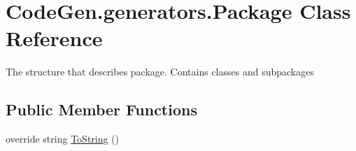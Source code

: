 \hypertarget{classCodeGen_1_1generators_1_1Package}{}\section{Code\+Gen.\+generators.\+Package Class Reference}
\label{classCodeGen_1_1generators_1_1Package}


The structure that describes package. Contains classes and subpackages  


\subsection*{Public Member Functions}
\begin{DoxyCompactItemize}
\item 
override string \mbox{\hyperlink{classCodeGen_1_1generators_1_1Package_a73029cd81fc68696bfe2d801ee382e69}{To\+String}} ()
\end{DoxyCompactItemize}
